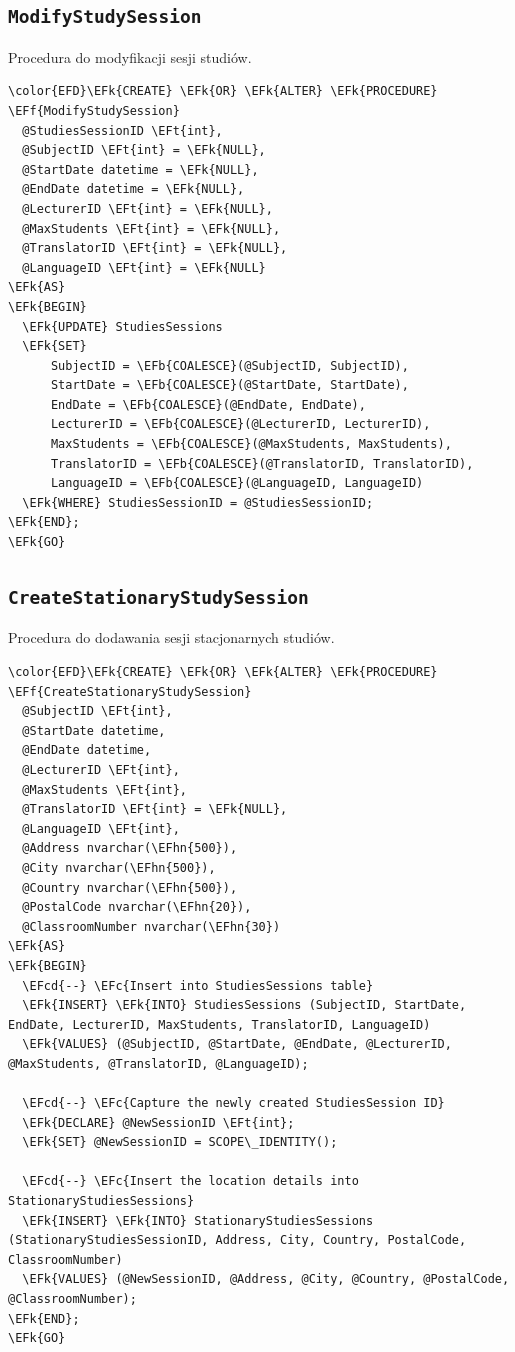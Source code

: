 \documentclass[11pt]{article}
\newcommand{\EFc}[1]{\textcolor{EFc}{\textit{#1}}} %
\newcommand{\EFcd}[1]{\textcolor{EFcd}{\textit{#1}}} %
\newcommand{\EFk}[1]{\textcolor{EFk}{\textbf{#1}}} %
\newcommand{\EFb}[1]{\textcolor{EFb}{\textbf{#1}}} %
\newcommand{\EFf}[1]{\textcolor{EFf}{#1}} %
\newcommand{\EFt}[1]{\textcolor{EFt}{\textbf{#1}}} %
\newcommand{\EFhn}[1]{\textcolor{EFhn}{#1}} %
\begin{document}
\subsection{\texttt{ModifyStudySession}}
\label{sec:org4e04e35}
Procedura do modyfikacji sesji studiów.
\begin{Code}
\begin{Verbatim}
\color{EFD}\EFk{CREATE} \EFk{OR} \EFk{ALTER} \EFk{PROCEDURE} \EFf{ModifyStudySession}
  @StudiesSessionID \EFt{int},
  @SubjectID \EFt{int} = \EFk{NULL},
  @StartDate datetime = \EFk{NULL},
  @EndDate datetime = \EFk{NULL},
  @LecturerID \EFt{int} = \EFk{NULL},
  @MaxStudents \EFt{int} = \EFk{NULL},
  @TranslatorID \EFt{int} = \EFk{NULL},
  @LanguageID \EFt{int} = \EFk{NULL}
\EFk{AS}
\EFk{BEGIN}
  \EFk{UPDATE} StudiesSessions
  \EFk{SET}
      SubjectID = \EFb{COALESCE}(@SubjectID, SubjectID),
      StartDate = \EFb{COALESCE}(@StartDate, StartDate),
      EndDate = \EFb{COALESCE}(@EndDate, EndDate),
      LecturerID = \EFb{COALESCE}(@LecturerID, LecturerID),
      MaxStudents = \EFb{COALESCE}(@MaxStudents, MaxStudents),
      TranslatorID = \EFb{COALESCE}(@TranslatorID, TranslatorID),
      LanguageID = \EFb{COALESCE}(@LanguageID, LanguageID)
  \EFk{WHERE} StudiesSessionID = @StudiesSessionID;
\EFk{END};
\EFk{GO}
\end{Verbatim}
\end{Code}
\subsection{\texttt{CreateStationaryStudySession}}
\label{sec:orgd895bf8}
Procedura do dodawania sesji stacjonarnych studiów.
\begin{Code}
\begin{Verbatim}
\color{EFD}\EFk{CREATE} \EFk{OR} \EFk{ALTER} \EFk{PROCEDURE} \EFf{CreateStationaryStudySession}
  @SubjectID \EFt{int},
  @StartDate datetime,
  @EndDate datetime,
  @LecturerID \EFt{int},
  @MaxStudents \EFt{int},
  @TranslatorID \EFt{int} = \EFk{NULL},
  @LanguageID \EFt{int},
  @Address nvarchar(\EFhn{500}),
  @City nvarchar(\EFhn{500}),
  @Country nvarchar(\EFhn{500}),
  @PostalCode nvarchar(\EFhn{20}),
  @ClassroomNumber nvarchar(\EFhn{30})
\EFk{AS}
\EFk{BEGIN}
  \EFcd{--} \EFc{Insert into StudiesSessions table}
  \EFk{INSERT} \EFk{INTO} StudiesSessions (SubjectID, StartDate, EndDate, LecturerID, MaxStudents, TranslatorID, LanguageID)
  \EFk{VALUES} (@SubjectID, @StartDate, @EndDate, @LecturerID, @MaxStudents, @TranslatorID, @LanguageID);

  \EFcd{--} \EFc{Capture the newly created StudiesSession ID}
  \EFk{DECLARE} @NewSessionID \EFt{int};
  \EFk{SET} @NewSessionID = SCOPE\_IDENTITY();

  \EFcd{--} \EFc{Insert the location details into StationaryStudiesSessions}
  \EFk{INSERT} \EFk{INTO} StationaryStudiesSessions (StationaryStudiesSessionID, Address, City, Country, PostalCode, ClassroomNumber)
  \EFk{VALUES} (@NewSessionID, @Address, @City, @Country, @PostalCode, @ClassroomNumber);
\EFk{END};
\EFk{GO}
\end{Verbatim}
\end{Code}
\end{document}
